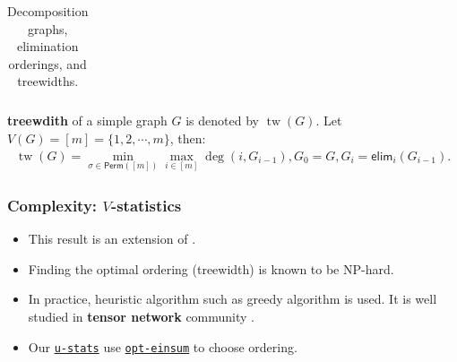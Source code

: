 \documentclass[9pt]{beamer}
\def\calA{\mathcal{A}}
\theoremstyle{mystyle}
\newtheorem{mylemma}{Lemma}
\theoremstyle{mystyletwo}
\def\bbX{\mathbb{X}}
\def\bbR{\mathbb{R}}
\def\bbR{\mathbb{R}}
\newcommand{\libref}[2]{\href{#2}{\texttt{#1}}}
\newcommand{\vstat}{\mathbb{V}}
\newcommand{\perm}[1]{\mathsf{Perm}(#1)}
\newcommand{\eliminatevg}[2]{\mathsf{elim}_{#1}(#2)}
\def\package{\libref{u-stats}{https://github.com/Amedar-Asterisk/U-Statistics-python}}
\newcommand{\opteinsum}{\libref{opt-einsum}{https://dgasmith.github.io/opt_einsum/}}
\begin{document}
\begin{frame}
\begin{table}[h]
\begin{tabular}{|c|c|c|c|}
\end{tabular}
\caption{Decomposition graphs, elimination orderings, and treewidths.}
\label{tab:graph_ordering_treewidth}

 \textbf{treewdith} of a simple graph $G$ is denoted by $\operatorname{tw}(G)$. Let $V(G) = 
            [m] = \{1,2,\cdots,m\}$, then:
            \begin{align*}
                \operatorname{tw}(G) = \min_{\sigma \in \perm{[m]}} \max_{ i \in [m]} \deg (i, G_{i-1} ), G_0 = G, G_i= \eliminatevg{i}{G_{i-1}}.
            \end{align*}
\end{table}


\end{frame}
\begin{frame}
\frametitle{ Complexity: $V$-statistics }
\begin{itemize}
\setlength\itemsep{1.5em}
   \begin{mylemma}[C., Zhang, Liu, 25]
                  \label{lem:v_complexity}
                 Let $\bbX$ be a non-empty set and $h: \bbX^{m} \rightarrow \bbR$ be a kernel function with a multiplicative decomposable $\calA$ and the complexity of evaluation of $h$ is $o(n)$. Then for any $\bm{X} \in \bbX^n: n \geq m$,
                  \begin{align*}
                      \mathrm{Complexity}( \vstat[h] ) = O(n^{\operatorname{tw}(G_{\calA})+1})
                  \end{align*}

              \end{mylemma}

        \item This result is an extension of \cite{markov2008simulating}.

        \item Finding the optimal ordering (treewidth) is known to be NP-hard. \citep{arnborg1987complexity}
      
        \item In practice, heuristic algorithm such as greedy algorithm is used. It is well studied in \textbf{tensor network} community \cite{gray2021hyper}.

        \item Our \package{} use  \opteinsum{} to choose ordering.
        
\end{itemize}
    
\end{frame}
\end{document}
